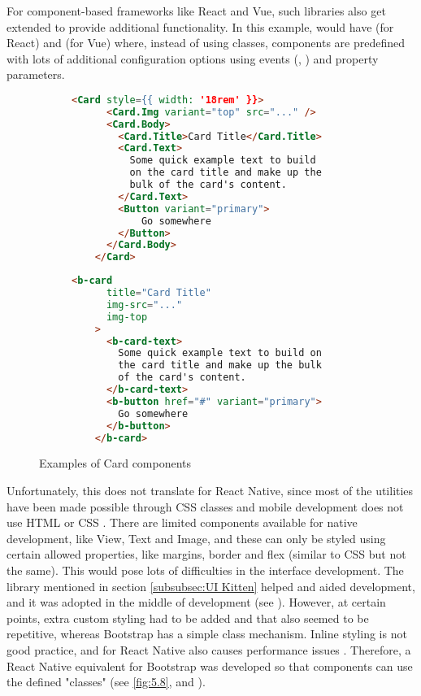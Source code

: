 \documentclass[../main.tex]{subfiles}
\begin{document}
For component-based frameworks like React and Vue, such libraries also get extended to provide additional functionality. In this example,  would have  (for React) and  (for Vue) where, instead of using classes, components are predefined with lots of additional configuration options using events (, ) and property parameters.

\begin{figure}
    \centering
    \noindent\begin{subfigure}{.49\textwidth}
    \begin{lstlisting}[language=html, caption={\href{https://react-bootstrap.github.io/components/cards/\#basic-example}{React-Bootstrap} \cite{CardsReactBootstrap}}]
    <Card style={{ width: '18rem' }}>
      <Card.Img variant="top" src="..." />
      <Card.Body>
        <Card.Title>Card Title</Card.Title>
        <Card.Text>
          Some quick example text to build
          on the card title and make up the
          bulk of the card's content.
        </Card.Text>
        <Button variant="primary">
            Go somewhere
        </Button>
      </Card.Body>
    </Card>
    \end{lstlisting}
    \end{subfigure}\hfill
    \begin{subfigure}{.49\textwidth}
    \begin{lstlisting}[language=html, caption={\href{https://bootstrap-vue.org/docs/components/card\#overview}{BootstrapVue} \cite{CardsBootstrapVue}}]
    <b-card
      title="Card Title"
      img-src="..."
      img-top
    >
      <b-card-text>
        Some quick example text to build on
        the card title and make up the bulk
        of the card's content.
      </b-card-text>
      <b-button href="#" variant="primary">
        Go somewhere
      </b-button>
    </b-card>
    \end{lstlisting}
    \end{subfigure}
    \caption{Examples of Card components}
\end{figure}

Unfortunately, this does not translate for React Native, since most of the utilities have been made possible through CSS classes and mobile development does not use HTML or CSS \cite{StyleReactNative}. There are limited components available for native development, like View, Text and Image, and these can only be styled using certain allowed properties, like margins, border and flex (similar to CSS but not the same). This would pose lots of difficulties in the interface development. The library mentioned in section \ref{subsubsec:UI Kitten} helped and aided development, and it was adopted in the middle of development (see ). However, at certain points, extra custom styling had to be added and that also seemed to be repetitive, whereas Bootstrap has a simple class mechanism. Inline styling is not good practice, and for React Native also causes performance issues \cite{StyleReactNative}. Therefore, a React Native equivalent for Bootstrap was developed so that components can use the defined "classes" (see \ref{fig:5.8},  and ).
\end{document}

